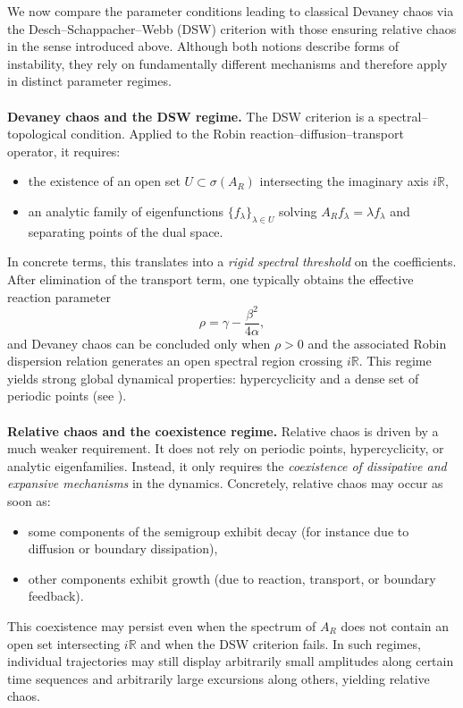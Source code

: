 \documentclass[12pt]{article}
\begin{document}
We now compare the parameter conditions leading to classical Devaney chaos via the Desch--Schappacher--Webb (DSW) criterion with those ensuring relative chaos in the sense introduced above. Although both notions describe forms of instability, they rely on fundamentally different mechanisms and therefore apply in distinct parameter regimes.
\\
\\
\textbf{Devaney chaos and the DSW regime.}
The DSW criterion is a spectral--topological condition. Applied to the Robin reaction--diffusion--transport operator, it requires:
\begin{itemize}
\item the existence of an open set $U\subset\sigma(A_R)$ intersecting the imaginary axis $i\mathbb{R}$,
\item an analytic family of eigenfunctions $\{f_\lambda\}_{\lambda\in U}$ solving $A_R f_\lambda=\lambda f_\lambda$ and separating points of the dual space.
\end{itemize}
In concrete terms, this translates into a \emph{rigid spectral threshold} on the coefficients. After elimination of the transport term, one typically obtains the effective reaction parameter
\[
\rho=\gamma-\frac{\beta^2}{4\alpha},
\]
and Devaney chaos can be concluded only when $\rho>0$ and the associated Robin dispersion relation generates an open spectral region crossing $i\mathbb{R}$. This regime yields strong global dynamical properties: hypercyclicity and a dense set of periodic points (see \cite{ZhuYang2025}).
\\
\\
\textbf{Relative chaos and the coexistence regime.}
Relative chaos is driven by a much weaker requirement. It does not rely on periodic points, hypercyclicity, or analytic eigenfamilies. Instead, it only requires the \emph{coexistence of dissipative and expansive mechanisms} in the dynamics. Concretely, relative chaos may occur as soon as:
\begin{itemize}
\item some components of the semigroup exhibit decay (for instance due to diffusion or boundary dissipation), 
\item other components exhibit growth (due to reaction, transport, or boundary feedback).
\end{itemize}
This coexistence may persist even when the spectrum of $A_R$ does not contain an open set intersecting $i\mathbb{R}$ and when the DSW criterion fails. In such regimes, individual trajectories may still display arbitrarily small amplitudes along certain time sequences and arbitrarily large excursions along others, yielding relative chaos.
\end{document}
